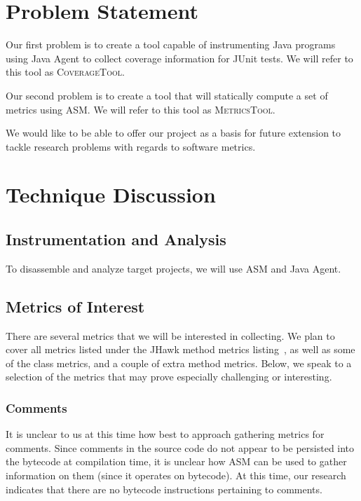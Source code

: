 \newcommand{\ct}{\mbox{\textsc{CoverageTool}}}
\newcommand{\mt}{\mbox{\textsc{MetricsTool}}}

\section{Problem Statement}

Our first problem is to create a tool capable of instrumenting Java programs using Java Agent to collect coverage information for JUnit tests. We will refer to this tool as \ct{}.

Our second problem is to create a tool that will statically compute a set of metrics using ASM. We will refer to this tool as \mt{}.

We would like to be able to offer our project as a basis for future extension to tackle research problems with regards to software metrics.

\section{Technique Discussion}

\subsection{Instrumentation and Analysis}

To disassemble and analyze target projects, we will use ASM and Java Agent.

\subsection{Metrics of Interest}

There are several metrics that we will be interested in  collecting. We plan to cover all metrics listed under the JHawk method metrics listing~\cite{jhawkmetrics}, as well as some of the class metrics, and a couple of extra method metrics. Below, we speak to a selection of the metrics that may prove especially challenging or interesting.

\subsubsection{Comments}

It is unclear to us at this time how best to approach gathering metrics for comments. Since comments in the source code do not appear to be persisted into the bytecode at compilation time, it is unclear how ASM can be used to gather information on them (since it operates on bytecode). At this time, our research indicates that there are no bytecode instructions pertaining to comments.

